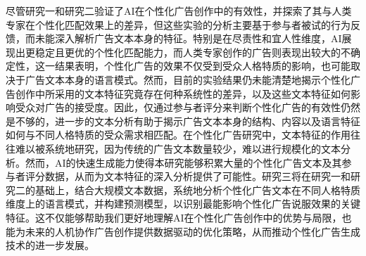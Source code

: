 尽管研究一和研究二验证了AI在个性化广告创作中的有效性，并探索了其与人类专家在个性化匹配效果上的差异，但这些实验的分析主要基于参与者被试的行为反馈，而未能深入解析广告文本本身的特征。特别是在尽责性和宜人性维度，AI展现出更稳定且更优的个性化匹配能力，而人类专家创作的广告则表现出较大的不确定性，这一结果表明，个性化广告的效果不仅受到受众人格特质的影响，也可能取决于广告文本本身的语言模式。然而，目前的实验结果仍未能清楚地揭示个性化广告创作中所采用的文本特征究竟存在何种系统性的差异，以及这些文本特征如何影响受众对广告的接受度。因此，仅通过参与者评分来判断个性化广告的有效性仍然是不够的，进一步的文本分析有助于揭示广告文本本身的结构、内容以及语言特征如何与不同人格特质的受众需求相匹配。在个性化广告研究中，文本特征的作用往往难以被系统地研究，因为传统的广告文本数量较少，难以进行规模化的文本分析。然而，AI的快速生成能力使得本研究能够积累大量的个性化广告文本及其参与者评分数据，从而为文本特征的深入分析提供了可能性。研究三将在研究一和研究二的基础上，结合大规模文本数据，系统地分析个性化广告文本在不同人格特质维度上的语言模式，并构建预测模型，以识别最能影响个性化广告说服效果的关键特征。这不仅能够帮助我们更好地理解AI在个性化广告创作中的优势与局限，也能为未来的人机协作广告创作提供数据驱动的优化策略，从而推动个性化广告生成技术的进一步发展。